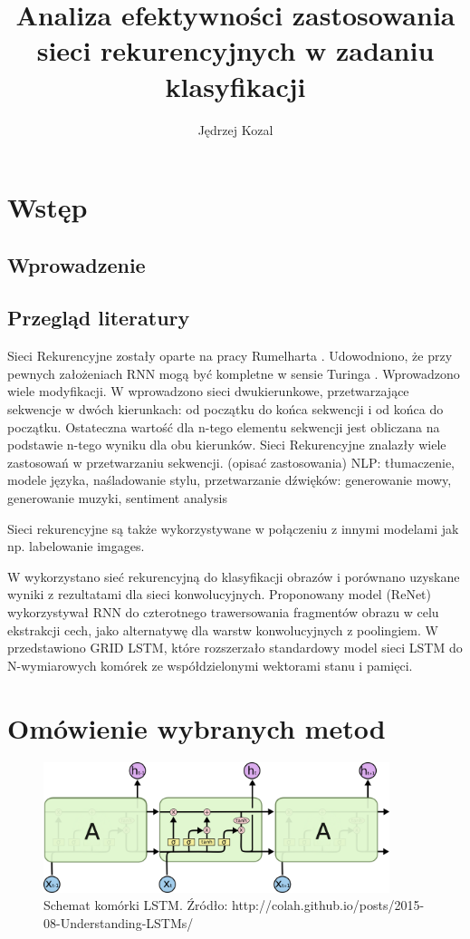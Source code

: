 \documentclass[oneside, mag]{mgr}
\title{Analiza efektywności zastosowania sieci rekurencyjnych w zadaniu klasyfikacji}
\author{Jędrzej Kozal}
\begin{document}
	

\maketitle

\chapter{Wstęp}

\section{Wprowadzenie}

\cite{Goodfellow-et-al-2016}

\section{Przegląd literatury}

Sieci Rekurencyjne zostały oparte na pracy Rumelharta \cite{RNN}. 
Udowodniono, że przy pewnych założeniach RNN mogą być kompletne w sensie Turinga \cite{turing-complete}.
Wprowadzono wiele modyfikacji. W \cite{bidirectional} wprowadzono sieci dwukierunkowe, przetwarzające sekwencje w dwóch kierunkach: od początku do końca sekwencji i od końca do początku. Ostateczna wartość dla n-tego elementu sekwencji jest obliczana na podstawie n-tego wyniku dla obu kierunków.
Sieci Rekurencyjne znalazły wiele zastosowań w przetwarzaniu sekwencji. (opisać zastosowania) NLP: tłumaczenie, modele języka, naśladowanie stylu, przetwarzanie dźwięków: generowanie mowy, generowanie muzyki, sentiment analysis 

Sieci rekurencyjne są także wykorzystywane w połączeniu z innymi modelami jak np. labelowanie imgages.

W \cite{DBLP:journals/corr/VisinKCMCB15} wykorzystano sieć rekurencyjną do klasyfikacji obrazów i porównano uzyskane wyniki z rezultatami dla sieci konwolucyjnych. Proponowany model (ReNet) wykorzystywał RNN do czterotnego trawersowania fragmentów obrazu w celu ekstrakcji cech, jako alternatywę dla warstw konwolucyjnych z poolingiem. W \cite{DBLP:journals/corr/KalchbrennerDG15} przedstawiono GRID LSTM, które rozszerzało standardowy model sieci LSTM do N-wymiarowych komórek ze współdzielonymi wektorami stanu i pamięci.

\chapter{Omówienie wybranych metod}

\begin{figure}
\centering
	\includegraphics[width=0.90\textwidth]{img/lstm_colah.png}
	\caption{Schemat komórki LSTM. Źródło: http://colah.github.io/posts/2015-08-Understanding-LSTMs/}
	\label{fig:lstm}
\end{figure}




\tableofcontents

\listoffigures
\end{document}
